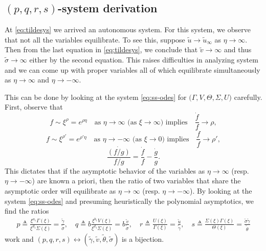 \documentclass[a4paper,11pt]{article}
\def\tg{{\tilde{\gamma}}}
\def\tv{{\tilde{v}}}
\def\tth{{\tilde{\theta}}}
\def\ts{{\tilde{\sigma}}}
\def\tu{{\tilde{u}}}
\begin{document}
\subsection{$(p,q,r,s)$-system derivation}
At \eqref{eq:tildesys} we arrived  an autonomous system. For this system, we observe that not all the variables equilibrate. To see this, suppose $\tu \rightarrow \tu_\infty$ as $\eta \rightarrow \infty$. Then from the last equation in \eqref{eq:tildesys}, we conclude that $\tv \rightarrow \infty$ and thus $\ts \rightarrow \infty$ either by the second equation. This raises difficulties in analyzing system and we can come up with proper variables all of which equilibrate simultaneously as $\eta \rightarrow \infty$ and $\eta \rightarrow -\infty$.

This can be done by looking at the system \eqref{eq:ss-odes} for $\big(\Gamma,V,\Theta,\Sigma,U)$ carefully. First, observe that
$$ f \sim \xi^\rho=e^{\rho\eta} \quad \text{as $\eta \rightarrow \infty$ (as $\xi \rightarrow \infty$) implies} \quad \frac{\dot{f}}{f} \rightarrow \rho,$$
$$ f \sim \xi^{\rho'}=e^{\rho'\eta} \quad \text{as $\eta \rightarrow -\infty$ (as $\xi \rightarrow 0$) implies} \quad \frac{\dot{f}}{f} \rightarrow \rho',$$
$$ \frac{\dot{(f/g)}}{f/g} = \frac{\dot{f}}{f} - \frac{\dot{g}}{g}. $$
This dictates that if the asymptotic behavior of the variables as $\eta \rightarrow \infty$ (resp. $\eta \rightarrow -\infty$) are known a priori, then the ratio of two variables that share the asymptotic order will equilibrate as $\eta \rightarrow \infty$ (resp. $\eta \rightarrow -\infty$). By looking at the system \eqref{eq:ss-odes} and presuming heuristically the polynomial asymptotics, we find the ratios
\begin{equation}\label{eq:pqrdef}
 \begin{aligned}
  p \triangleq \frac{ \xi^{a_1} \Gamma(\xi)}{\xi^{d_1} \Sigma(\xi)}=\frac{\tg}{\ts}, \quad q \triangleq b\frac{ \xi^{b_1} V(\xi) }{ \xi^{d_1} \Sigma(\xi)}=b \frac{\tv}{\ts},  \quad r \triangleq \frac{ U(\xi) }{ \Gamma(\xi) } = \frac{\tu}{\tg}, \quad s \triangleq \frac{\Sigma(\xi)\Gamma(\xi)}{\Theta(\xi)} = \frac{\ts\tg}{\tth}
 \end{aligned}
\end{equation}
 work and $(p,q,r,s) \leftrightarrow (\tg,\tv, \tth,\ts)$ is a bijection.
 
\end{document}
